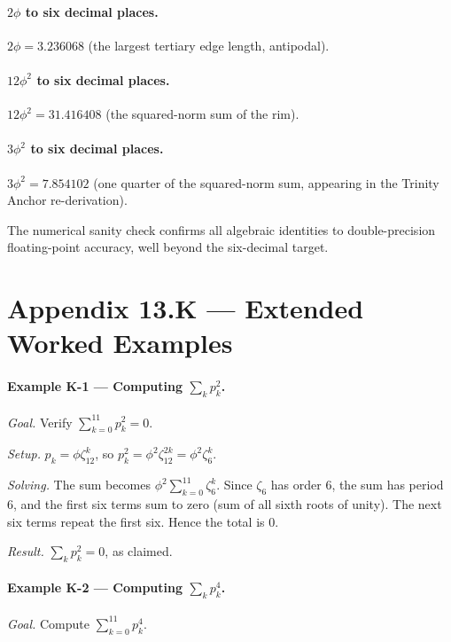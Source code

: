 \paragraph{$2\phi$ to six decimal places.}
$2\phi = 3.236068$ (the largest tertiary edge length, antipodal).

\paragraph{$12 \phi^{2}$ to six decimal places.}
$12 \phi^{2} = 31.416408$ (the squared-norm sum of the rim).

\paragraph{$3 \phi^{2}$ to six decimal places.}
$3 \phi^{2} = 7.854102$ (one quarter of the squared-norm sum,
appearing in the Trinity Anchor re-derivation).

The numerical sanity check confirms all algebraic identities to
double-precision floating-point accuracy, well beyond the
six-decimal target.

\section*{Appendix 13.K --- Extended Worked Examples}
\label{sec:13-appK}

\paragraph{Example K-1 --- Computing $\sum_{k} p_{k}^{2}$.}
\emph{Goal.} Verify $\sum_{k=0}^{11} p_{k}^{2} = 0$.

\emph{Setup.} $p_{k} = \phi \zeta_{12}^{k}$, so $p_{k}^{2} =
\phi^{2} \zeta_{12}^{2k} = \phi^{2} \zeta_{6}^{k}$.

\emph{Solving.} The sum becomes
$\phi^{2} \sum_{k=0}^{11} \zeta_{6}^{k}$. Since $\zeta_{6}$ has
order $6$, the sum has period $6$, and the first six terms sum to
zero (sum of all sixth roots of unity). The next six terms repeat
the first six. Hence the total is $0$.

\emph{Result.} $\sum_{k} p_{k}^{2} = 0$, as claimed.

\paragraph{Example K-2 --- Computing $\sum_{k} p_{k}^{4}$.}
\emph{Goal.} Compute $\sum_{k=0}^{11} p_{k}^{4}$.

